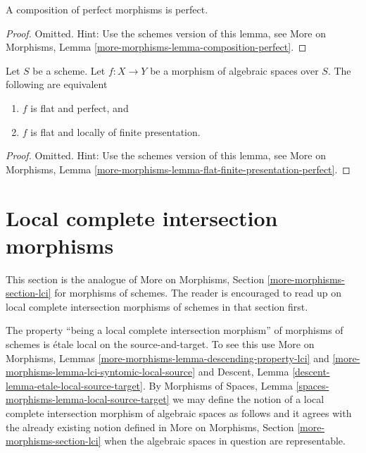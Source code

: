 \begin{lemma}
\label{lemma-composition-perfect}
A composition of perfect morphisms is perfect.
\end{lemma}

\begin{proof}
Omitted. Hint: Use the schemes version of this lemma, see
More on Morphisms,
Lemma \ref{more-morphisms-lemma-composition-perfect}.
\end{proof}

\begin{lemma}
\label{lemma-flat-finite-presentation-perfect}
Let $S$ be a scheme. Let $f : X \to Y$ be a morphism of algebraic spaces over
$S$. The following are equivalent
\begin{enumerate}
\item $f$ is flat and perfect, and
\item $f$ is flat and locally of finite presentation.
\end{enumerate}
\end{lemma}

\begin{proof}
Omitted. Hint: Use the schemes version of this lemma, see
More on Morphisms,
Lemma \ref{more-morphisms-lemma-flat-finite-presentation-perfect}.
\end{proof}









\section{Local complete intersection morphisms}
\label{section-lci}

\noindent
This section is the analogue of
More on Morphisms, Section \ref{more-morphisms-section-lci}
for morphisms of schemes. The reader is encouraged to read up
on local complete intersection morphisms of schemes in that section first.

\medskip\noindent
The property ``being a local complete intersection morphism'' of morphisms
of schemes is \'etale local on the source-and-target. To see this use
More on Morphisms,
Lemmas \ref{more-morphisms-lemma-descending-property-lci} and
\ref{more-morphisms-lemma-lci-syntomic-local-source}
and
Descent, Lemma \ref{descent-lemma-etale-local-source-target}.
By
Morphisms of Spaces,
Lemma \ref{spaces-morphisms-lemma-local-source-target}
we may define the notion of a local complete intersection morphism
of algebraic spaces as follows and it agrees with the already existing
notion defined in
More on Morphisms, Section \ref{more-morphisms-section-lci}
when the algebraic spaces in question are representable.

